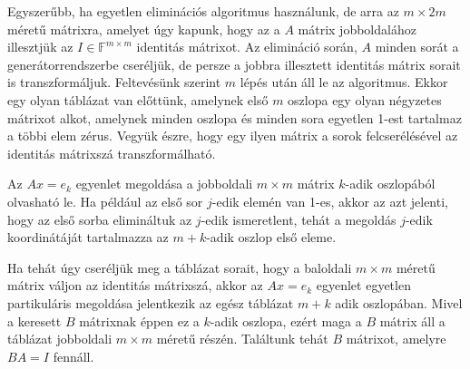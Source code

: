 \documentclass[a4paper, showtrims]{memoir}
\theoremstyle{plain}
\theoremstyle{remark}
\theoremstyle{definition}
\begin{document}
Egyszerűbb,
ha egyetlen eliminációs algoritmus használunk, de arra az $m\times 2m$ méretű mátrixra,
amelyet úgy kapunk, hogy az a $A$ mátrix jobboldalához illesztjük az $I\in\mathbb{F}^{m\times m}$ identitás mátrixot.
Az elimináció során,
$A$ minden sorát a generátorrendszerbe cseréljük, de persze a jobbra illesztett identitás
mátrix sorait is transzformáljuk.
Feltevésünk szerint $m$ lépés után áll le az algoritmus.
Ekkor egy  olyan táblázat van előttünk, amelynek első $m$ oszlopa egy olyan négyzetes
mátrixot alkot, amelynek minden oszlopa és minden sora egyetlen 1-est tartalmaz a többi elem zérus.
Vegyük észre,
hogy egy ilyen mátrix a sorok felcserélésével az identitás mátrixszá transzformálható.

Az $Ax=e_k$ egyenlet megoldása a jobboldali $m\times m$ mátrix $k$-adik oszlopából olvasható le.
Ha például az első sor $j$-edik elemén van 1-es,
akkor az azt jelenti, hogy az első sorba elimináltuk az $j$-edik ismeretlent,
tehát a megoldás $j$-edik koordinátáját tartalmazza az $m+k$-adik oszlop első eleme.

Ha tehát úgy cseréljük meg a táblázat sorait,
hogy a baloldali $m\times m$ méretű mátrix váljon az identitás mátrixszá,
akkor az $Ax=e_k$ egyenlet egyetlen partikuláris megoldása jelentkezik az egész táblázat
$m+k$ adik oszlopában.
Mivel a keresett $B$ mátrixnak éppen ez a $k$-adik oszlopa,
ezért maga a $B$ mátrix áll a táblázat jobboldali $m\times m$ méretű részén.
Találtunk tehát $B$ mátrixot, amelyre $BA=I$ fennáll.
\end{document}
